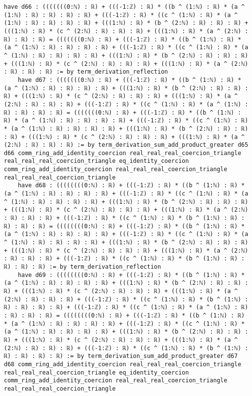 \documentclass{article}
\begin{document}
\begin{tcolorbox}[colback=white!10, width=\linewidth]
\begin{lstlisting}[language=Lean4]
    have d66 : (((((((0:ℕ) : ℝ) + (((-1:ℤ) : ℝ) * ((b ^ (1:ℕ) : ℝ) * (a ^ (1:ℕ) : ℝ) : ℝ) : ℝ) : ℝ) + (((-1:ℤ) : ℝ) * ((c ^ (1:ℕ) : ℝ) * (a ^ (1:ℕ) : ℝ) : ℝ) : ℝ) : ℝ) + (((1:ℕ) : ℝ) * (b ^ (2:ℕ) : ℝ) : ℝ) : ℝ) + (((1:ℕ) : ℝ) * (c ^ (2:ℕ) : ℝ) : ℝ) : ℝ) + (((1:ℕ) : ℝ) * (a ^ (2:ℕ) : ℝ) : ℝ) : ℝ) = (((((((0:ℕ) : ℝ) + (((-1:ℤ) : ℝ) * ((b ^ (1:ℕ) : ℝ) * (a ^ (1:ℕ) : ℝ) : ℝ) : ℝ) : ℝ) + (((-1:ℤ) : ℝ) * ((c ^ (1:ℕ) : ℝ) * (a ^ (1:ℕ) : ℝ) : ℝ) : ℝ) : ℝ) + (((1:ℕ) : ℝ) * (b ^ (2:ℕ) : ℝ) : ℝ) : ℝ) + (((1:ℕ) : ℝ) * (c ^ (2:ℕ) : ℝ) : ℝ) : ℝ) + (((1:ℕ) : ℝ) * (a ^ (2:ℕ) : ℝ) : ℝ) : ℝ) := by term_derivation_reflection
    have d67 : (((((((0:ℕ) : ℝ) + (((-1:ℤ) : ℝ) * ((b ^ (1:ℕ) : ℝ) * (a ^ (1:ℕ) : ℝ) : ℝ) : ℝ) : ℝ) + (((1:ℕ) : ℝ) * (b ^ (2:ℕ) : ℝ) : ℝ) : ℝ) + (((1:ℕ) : ℝ) * (c ^ (2:ℕ) : ℝ) : ℝ) : ℝ) + (((1:ℕ) : ℝ) * (a ^ (2:ℕ) : ℝ) : ℝ) : ℝ) + (((-1:ℤ) : ℝ) * ((c ^ (1:ℕ) : ℝ) * (a ^ (1:ℕ) : ℝ) : ℝ) : ℝ) : ℝ) = (((((((0:ℕ) : ℝ) + (((-1:ℤ) : ℝ) * ((b ^ (1:ℕ) : ℝ) * (a ^ (1:ℕ) : ℝ) : ℝ) : ℝ) : ℝ) + (((-1:ℤ) : ℝ) * ((c ^ (1:ℕ) : ℝ) * (a ^ (1:ℕ) : ℝ) : ℝ) : ℝ) : ℝ) + (((1:ℕ) : ℝ) * (b ^ (2:ℕ) : ℝ) : ℝ) : ℝ) + (((1:ℕ) : ℝ) * (c ^ (2:ℕ) : ℝ) : ℝ) : ℝ) + (((1:ℕ) : ℝ) * (a ^ (2:ℕ) : ℝ) : ℝ) : ℝ) := by term_derivation_sum_add_product_greater d65 d66 comm_ring_add_identity_coercion real_real_real_coercion_triangle real_real_real_coercion_triangle eq_identity_coercion comm_ring_add_identity_coercion real_real_real_coercion_triangle real_real_real_coercion_triangle
    have d68 : ((((((((0:ℕ) : ℝ) + (((-1:ℤ) : ℝ) * ((b ^ (1:ℕ) : ℝ) * (a ^ (1:ℕ) : ℝ) : ℝ) : ℝ) : ℝ) + (((-1:ℤ) : ℝ) * ((c ^ (1:ℕ) : ℝ) * (a ^ (1:ℕ) : ℝ) : ℝ) : ℝ) : ℝ) + (((1:ℕ) : ℝ) * (b ^ (2:ℕ) : ℝ) : ℝ) : ℝ) + (((1:ℕ) : ℝ) * (c ^ (2:ℕ) : ℝ) : ℝ) : ℝ) + (((1:ℕ) : ℝ) * (a ^ (2:ℕ) : ℝ) : ℝ) : ℝ) + (((-1:ℤ) : ℝ) * ((c ^ (1:ℕ) : ℝ) * (b ^ (1:ℕ) : ℝ) : ℝ) : ℝ) : ℝ) = ((((((((0:ℕ) : ℝ) + (((-1:ℤ) : ℝ) * ((b ^ (1:ℕ) : ℝ) * (a ^ (1:ℕ) : ℝ) : ℝ) : ℝ) : ℝ) + (((-1:ℤ) : ℝ) * ((c ^ (1:ℕ) : ℝ) * (a ^ (1:ℕ) : ℝ) : ℝ) : ℝ) : ℝ) + (((1:ℕ) : ℝ) * (b ^ (2:ℕ) : ℝ) : ℝ) : ℝ) + (((1:ℕ) : ℝ) * (c ^ (2:ℕ) : ℝ) : ℝ) : ℝ) + (((1:ℕ) : ℝ) * (a ^ (2:ℕ) : ℝ) : ℝ) : ℝ) + (((-1:ℤ) : ℝ) * ((c ^ (1:ℕ) : ℝ) * (b ^ (1:ℕ) : ℝ) : ℝ) : ℝ) : ℝ) := by term_derivation_reflection
    have d69 : ((((((((0:ℕ) : ℝ) + (((-1:ℤ) : ℝ) * ((b ^ (1:ℕ) : ℝ) * (a ^ (1:ℕ) : ℝ) : ℝ) : ℝ) : ℝ) + (((1:ℕ) : ℝ) * (b ^ (2:ℕ) : ℝ) : ℝ) : ℝ) + (((1:ℕ) : ℝ) * (c ^ (2:ℕ) : ℝ) : ℝ) : ℝ) + (((1:ℕ) : ℝ) * (a ^ (2:ℕ) : ℝ) : ℝ) : ℝ) + (((-1:ℤ) : ℝ) * ((c ^ (1:ℕ) : ℝ) * (b ^ (1:ℕ) : ℝ) : ℝ) : ℝ) : ℝ) + (((-1:ℤ) : ℝ) * ((c ^ (1:ℕ) : ℝ) * (a ^ (1:ℕ) : ℝ) : ℝ) : ℝ) : ℝ) = ((((((((0:ℕ) : ℝ) + (((-1:ℤ) : ℝ) * ((b ^ (1:ℕ) : ℝ) * (a ^ (1:ℕ) : ℝ) : ℝ) : ℝ) : ℝ) + (((-1:ℤ) : ℝ) * ((c ^ (1:ℕ) : ℝ) * (a ^ (1:ℕ) : ℝ) : ℝ) : ℝ) : ℝ) + (((1:ℕ) : ℝ) * (b ^ (2:ℕ) : ℝ) : ℝ) : ℝ) + (((1:ℕ) : ℝ) * (c ^ (2:ℕ) : ℝ) : ℝ) : ℝ) + (((1:ℕ) : ℝ) * (a ^ (2:ℕ) : ℝ) : ℝ) : ℝ) + (((-1:ℤ) : ℝ) * ((c ^ (1:ℕ) : ℝ) * (b ^ (1:ℕ) : ℝ) : ℝ) : ℝ) : ℝ) := by term_derivation_sum_add_product_greater d67 d68 comm_ring_add_identity_coercion real_real_real_coercion_triangle real_real_real_coercion_triangle eq_identity_coercion comm_ring_add_identity_coercion real_real_real_coercion_triangle real_real_real_coercion_triangle

\end{lstlisting}
\end{tcolorbox}
\end{document}
